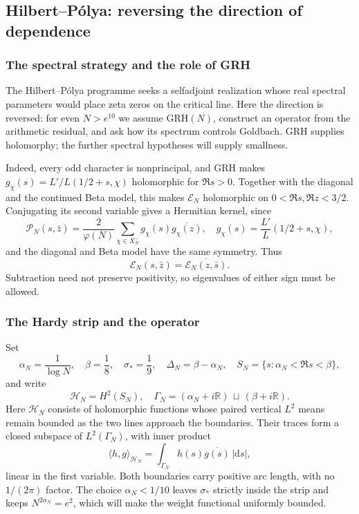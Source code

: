 \documentclass[12pt,a4paper]{amsart}
\numberwithin{equation}{section}
\theoremstyle{plain}
\theoremstyle{definition}
\theoremstyle{remark}
\begin{document}
\subsection{Hilbert--P\'olya: reversing the direction of dependence}
\label{story:hilbert-polya}

\subsubsection{The spectral strategy and the role of GRH}
\label{story:polya-strategy}

The Hilbert--P\'olya programme seeks a selfadjoint realization
whose real spectral parameters would place zeta zeros on the
critical line. Here the direction is reversed: for even
$N>e^{10}$ we assume $\mathrm{GRH}(N)$, construct an operator
from the arithmetic residual, and ask how its spectrum controls
Goldbach. GRH supplies holomorphy; the further spectral hypotheses
will supply smallness.

Indeed, every odd character is nonprincipal, and GRH makes
$g_\chi(s)=L'/L(1/2+s,\chi)$ holomorphic for $\Re s>0$.
Together with the diagonal and the continued Beta model, this
makes $\mathscr E_N$ holomorphic on $0<\Re s,\Re z<3/2$.
Conjugating its second variable gives a Hermitian kernel, since
\begin{equation}\label{qp:Gram}
 \mathscr P_N(s,\bar z)=\frac2{\varphi(N)}\sum_{\chi\in X_N^-}
                 g_\chi(s)\overline{g_\chi(z)},
 \quad g_\chi(s)=\frac{L'}L(1/2+s,\chi),
\end{equation}
and the diagonal and Beta model have the same symmetry.
Thus
\[
 \mathscr E_N(s,\bar z)=\overline{\mathscr E_N(z,\bar s)}.
\]
Subtraction need not preserve positivity, so eigenvalues of either
sign must be allowed.

\subsubsection{The Hardy strip and the operator}
\label{story:polya-space}

Set
\begin{equation}\label{hd:strip}
 \alpha_N=\frac1{\log N},\quad \beta=\frac18,\quad \sigma_*=\frac19,
 \quad \Delta_N=\beta-\alpha_N,\quad
 S_N=\{s:\alpha_N<\Re s<\beta\},
\end{equation}
and write
\begin{equation}\label{hd:space-and-boundary}
 \mathcal H_N=H^2(S_N),\quad
 \Gamma_N=(\alpha_N+i\mathbb R)\,\sqcup\,(\beta+i\mathbb R).
\end{equation}
Here $\mathcal H_N$ consists of holomorphic functions whose paired
vertical $L^2$ means remain bounded as the two lines approach
the boundaries. Their traces form a closed subspace of
$L^2(\Gamma_N)$, with inner product
\begin{equation}\label{hd:inner-product}
 \langle h,g\rangle_{\mathcal H_N}
       =\int_{\Gamma_N}h(s)\overline{g(s)}\,|\mathrm{d}s|,
\end{equation}
linear in the first variable. Both boundaries carry positive arc
length, with no $1/(2\pi)$ factor. The choice
$\alpha_N<1/10$ leaves $\sigma_*$ strictly inside the strip and
keeps $N^{2\alpha_N}=e^2$, which will make the weight functional
uniformly bounded.
\end{document}
